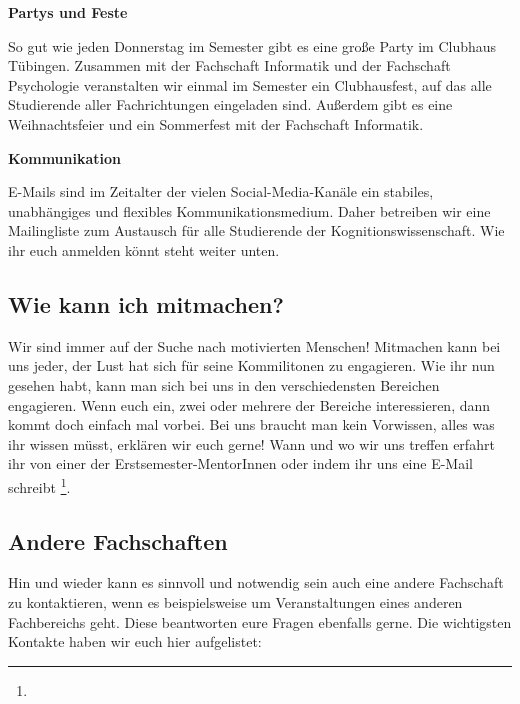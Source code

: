 \pagebreak

\textbf{Partys und Feste}

So gut wie jeden Donnerstag im Semester gibt es eine große Party im Clubhaus Tübingen. Zusammen mit der Fachschaft Informatik und der Fachschaft Psychologie veranstalten wir einmal im Semester ein Clubhausfest, auf das alle Studierende aller Fachrichtungen eingeladen sind. Außerdem gibt es eine Weihnachtsfeier und ein Sommerfest mit der Fachschaft Informatik.

\textbf{Kommunikation}

E-Mails sind im Zeitalter der vielen Social-Media-Kanäle ein stabiles, unabhängiges und flexibles Kommunikationsmedium. Daher betreiben wir eine Mailingliste zum Austausch für alle Studierende der Kognitionswissenschaft. Wie ihr euch anmelden könnt steht weiter unten. \\

\subsection{Wie kann ich mitmachen?}
Wir sind immer auf der Suche nach motivierten Menschen! Mitmachen kann bei uns jeder, der Lust hat sich für seine Kommilitonen zu engagieren. Wie ihr nun gesehen habt, kann man sich bei uns in den verschiedensten Bereichen engagieren. Wenn euch ein, zwei oder mehrere der Bereiche interessieren, dann kommt doch einfach mal vorbei. Bei uns braucht man kein Vorwissen, alles was ihr wissen müsst, erklären wir euch gerne!
Wann und wo wir uns treffen erfahrt ihr von einer der Erstsemester-MentorInnen oder indem ihr uns eine E-Mail schreibt \footnote{}.

\vfill
\subsection{Andere Fachschaften}
Hin und wieder kann es sinnvoll und notwendig sein auch eine andere Fachschaft zu kontaktieren, wenn es beispielsweise um Veranstaltungen eines anderen Fachbereichs geht. Diese beantworten eure Fragen ebenfalls gerne. Die wichtigsten Kontakte haben wir euch hier aufgelistet:

